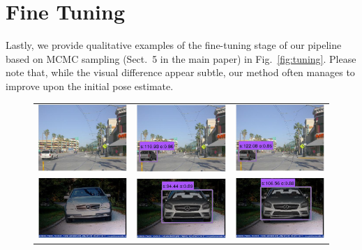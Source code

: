 \documentclass[10pt,twocolumn,letterpaper]{article}
\begin{document}
\section{Fine Tuning}
Lastly, we provide qualitative examples of the fine-tuning stage of
our pipeline based on MCMC sampling (Sect.~5 in the main paper) in
Fig.~\ref{fig:tuning}. Please note that, while the visual difference
appear subtle, our method often manages to improve upon the initial
pose estimate.
%
\begin{figure}[h]
\setlength\tabcolsep{1pt}
\centering
\begin{tabular}{ccc}
  \includegraphics[width=0.22\linewidth]{supp/tuning_1a.png} &
  \includegraphics[width=0.22\linewidth]{supp/tuning_1b.png} & 
  \includegraphics[width=0.22\linewidth]{supp/tuning_1c.png}  \\
  \includegraphics[width=0.22\linewidth]{supp/tuning_7a.png} &
  \includegraphics[width=0.22\linewidth]{supp/tuning_7b.png} & 
  \includegraphics[width=0.22\linewidth]{supp/tuning_7c.png}  \\ 

\end{tabular}
\end{figure}
\end{document}
